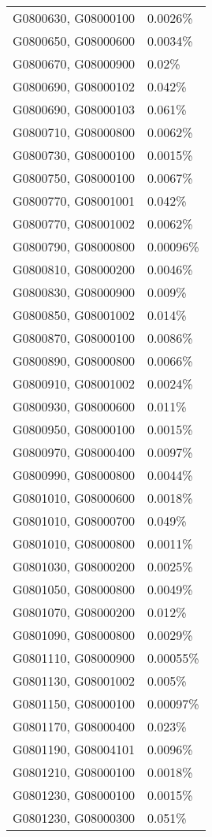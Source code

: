 \begin{longtable}[]{@{}ll@{}}
G0800630, G08000100 & 0.0026\% \\
G0800650, G08000600 & 0.0034\% \\
G0800670, G08000900 & 0.02\% \\
G0800690, G08000102 & 0.042\% \\
G0800690, G08000103 & 0.061\% \\
G0800710, G08000800 & 0.0062\% \\
G0800730, G08000100 & 0.0015\% \\
G0800750, G08000100 & 0.0067\% \\
G0800770, G08001001 & 0.042\% \\
G0800770, G08001002 & 0.0062\% \\
G0800790, G08000800 & 0.00096\% \\
G0800810, G08000200 & 0.0046\% \\
G0800830, G08000900 & 0.009\% \\
G0800850, G08001002 & 0.014\% \\
G0800870, G08000100 & 0.0086\% \\
G0800890, G08000800 & 0.0066\% \\
G0800910, G08001002 & 0.0024\% \\
G0800930, G08000600 & 0.011\% \\
G0800950, G08000100 & 0.0015\% \\
G0800970, G08000400 & 0.0097\% \\
G0800990, G08000800 & 0.0044\% \\
G0801010, G08000600 & 0.0018\% \\
G0801010, G08000700 & 0.049\% \\
G0801010, G08000800 & 0.0011\% \\
G0801030, G08000200 & 0.0025\% \\
G0801050, G08000800 & 0.0049\% \\
G0801070, G08000200 & 0.012\% \\
G0801090, G08000800 & 0.0029\% \\
G0801110, G08000900 & 0.00055\% \\
G0801130, G08001002 & 0.005\% \\
G0801150, G08000100 & 0.00097\% \\
G0801170, G08000400 & 0.023\% \\
G0801190, G08004101 & 0.0096\% \\
G0801210, G08000100 & 0.0018\% \\
G0801230, G08000100 & 0.0015\% \\
G0801230, G08000300 & 0.051\% \\

\end{longtable}
